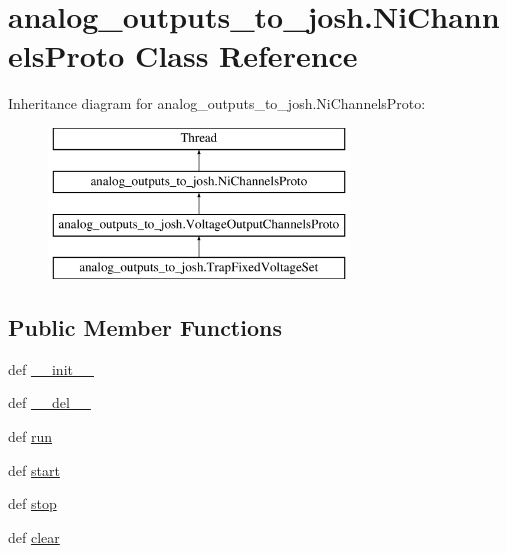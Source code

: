 \hypertarget{classanalog__outputs__to__josh_1_1_ni_channels_proto}{\section{analog\-\_\-outputs\-\_\-to\-\_\-josh.\-Ni\-Channels\-Proto Class Reference}
\label{classanalog__outputs__to__josh_1_1_ni_channels_proto}
}
Inheritance diagram for analog\-\_\-outputs\-\_\-to\-\_\-josh.\-Ni\-Channels\-Proto\-:\begin{figure}[H]
\begin{center}
\leavevmode
\includegraphics[height=4.000000cm]{classanalog__outputs__to__josh_1_1_ni_channels_proto}
\end{center}
\end{figure}
\subsection*{Public Member Functions}
\begin{DoxyCompactItemize}
\item 
def \hyperlink{classanalog__outputs__to__josh_1_1_ni_channels_proto_adae63984eacc158b84063cc3a4a565d4}{\-\_\-\-\_\-init\-\_\-\-\_\-}
\item 
def \hyperlink{classanalog__outputs__to__josh_1_1_ni_channels_proto_aa0b36977b20b3a1366969ff2b861dfe0}{\-\_\-\-\_\-del\-\_\-\-\_\-}
\item 
def \hyperlink{classanalog__outputs__to__josh_1_1_ni_channels_proto_aac7fc09c6b9ae9eca29445be92a58bc3}{run}
\item 
def \hyperlink{classanalog__outputs__to__josh_1_1_ni_channels_proto_aa22c9a0180714cfb7e77fa6da7c321da}{start}
\item 
def \hyperlink{classanalog__outputs__to__josh_1_1_ni_channels_proto_ad91d6aa1c960ae15253c59efdd81d5a2}{stop}
\item 
def \hyperlink{classanalog__outputs__to__josh_1_1_ni_channels_proto_a0e7e45dad2adf3f85f0e9001147edd01}{clear}
\end{DoxyCompactItemize}
